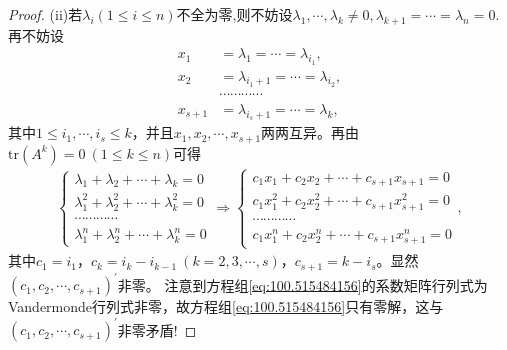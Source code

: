 \documentclass[../../main.tex]{subfiles}%
\begin{document}
\begin{proof}
(ii)若$\lambda_i(1\leqslant  i\leqslant  n)$不全为零,则不妨设$\lambda_1,\cdots,\lambda_k\ne 0,\lambda_{k+1}=\cdots=\lambda_n=0$.再不妨设
\begin{align*}
x_1&=\lambda _1=\cdots =\lambda _{i_1},\\
x_2&=\lambda _{i_1+1}=\cdots =\lambda _{i_2},\\
&\cdots \cdots \cdots \cdots \\
x_{s + 1}&=\lambda _{i_s+1}=\cdots =\lambda _k,
\end{align*}
其中$1\leqslant  i_1,\cdots,i_s\leqslant  k$，并且$x_1,x_2,\cdots,x_{s + 1}$两两互异。再由$\mathrm{tr}(A^k)=0\ (1\leqslant  k\leqslant  n)$可得
\begin{align}
\begin{cases}
\lambda _1+\lambda _2+\cdots +\lambda _k=0\\
\lambda _{1}^{2}+\lambda _{2}^{2}+\cdots +\lambda _{k}^{2}=0\\
\cdots \cdots \cdots \cdots\\
\lambda _{1}^{n}+\lambda _{2}^{n}+\cdots +\lambda _{k}^{n}=0
\end{cases}\Rightarrow 
\begin{cases}
c_1x_1+c_2x_2+\cdots +c_{s + 1}x_{s + 1}=0\\
c_1x_{1}^{2}+c_2x_{2}^{2}+\cdots +c_{s + 1}x_{s + 1}^{2}=0\\
\cdots \cdots \cdots \cdots\\
c_1x_{1}^{n}+c_2x_{2}^{n}+\cdots +c_{s + 1}x_{s + 1}^{n}=0
\end{cases}, \label{eq:100.515484156}
\end{align}
其中$c_1 = i_1$，$c_k = i_k - i_{k - 1}\ (k = 2,3,\cdots,s)$，$c_{s + 1} = k - i_s$。显然$(c_1,c_2,\cdots,c_{s + 1})^\prime$非零。
注意到方程组\eqref{eq:100.515484156}的系数矩阵行列式为Vandermonde行列式非零，故方程组\eqref{eq:100.515484156}只有零解，这与$(c_1,c_2,\cdots,c_{s + 1})^\prime$非零矛盾! 

\end{proof}
\end{document}
